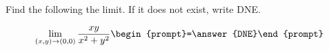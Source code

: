 \documentclass{ximera}
\author{David Guichard \and Neal Koblitz \and H. Jerome Keisler \and Albert Scheller \and Barry Balof \and Mike Wills \and Matthew Carr}
\begin{document}
\begin{exercise}




Find the following the limit. If it does not exist, write DNE. 

\[
\lim_{(x,y)\to(0,0)}\frac{xy}{x^2+y^2}\begin{prompt}=\answer{DNE}\end{prompt}
\]

\end{exercise}
\end{document}
